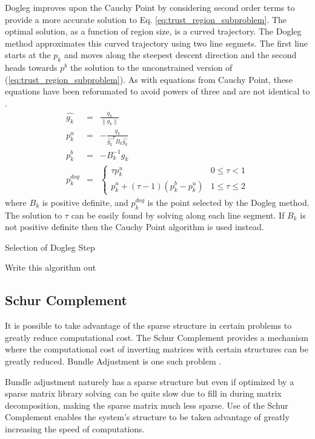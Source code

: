\documentclass[peerreview,compsoc,onecolumn]{IEEEtran}
\newcommand{\norm}[1]{\left\lVert#1\right\rVert}
\begin{document}
Dogleg improves upon the Cauchy Point by considering second order terms to provide a more accurate solution to Eq. \ref{eq:trust_region_subproblem}. The optimal solution, as a function of region size, is a curved trajectory. The Dogleg method approximates this curved trajectory using two line segmets. The first line starts at the $p_k$ and moves along the steepest descent direction and the second heads towards $p^b$ the solution to the unconstrained version of (\ref{eq:trust_region_subproblem}). As with equations from Cauchy Point, these equations have been reforumated to avoid powers of three and are not identical to \cite{numopt2006,IMM2004}.
\begin{eqnarray}
\hat{g_k} &=& \frac{g_k}{\norm{g_k}} \\
p^u_k &=& -\frac{g_k}{\hat{g_k}^T B_k \hat{g_k}} \\
p^b_k &=& -B^{-1}_k g_k \\
p^{dog}_k &=&
\begin{cases}
	\tau p^u_k & 0 \le \tau < 1 \\
	p^u_k + (\tau -1)(p^b_k-p^u_k) & 1 \le \tau \le 2
\end{cases}
\end{eqnarray}
where $B_k$ is positive definite, and $p^{dog}_k$ is the point selected by the Dogleg method. The solution to $\tau$ can be easily found by solving along each line segment. If $B_k$ is not positive definite then the Cauchy Point algorithm is used instead.

\begin{algorithm}{}
\caption{\label{alg:dogleg_step}Selection of Dogleg Step}
\begin{algorithmic}[1]
	\State Write this algorithm out
\end{algorithmic}
\end{algorithm}

\subsection{Schur Complement}
It is possible to take advantage of the sparse structure in certain problems to greatly reduce computational cost. The Schur Complement provides a mechanism where the computational cost of inverting matrices with certain structures can be greatly reduced. Bundle Adjustment is one such problem \cite{triggs1999bundle}. 

Bundle adjustment naturely has a sparse structure \cite{triggs1999bundle} but even if optimized by a sparse matrix library solving can be quite slow due to fill in during matrix decomposition, making the sparse matrix much less sparse. Use of the Schur Complement enables the system's structure to be taken advantage of greatly increasing the speed of computations.
\end{document}

